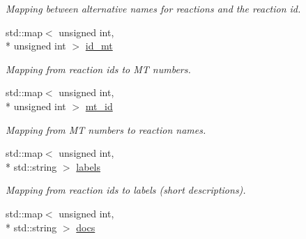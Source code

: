 \begin{DoxyCompactItemize}
\begin{DoxyCompactList}\small\item\em Mapping between alternative names for reactions and the reaction id. \end{DoxyCompactList}\item 
\hypertarget{namespacepyne_1_1rxname_a94ff01a63e221db69f259fa48616d3d5}{std\-::map$<$ unsigned int, \\*
unsigned int $>$ \hyperlink{namespacepyne_1_1rxname_a94ff01a63e221db69f259fa48616d3d5}{id\-\_\-mt}}\label{namespacepyne_1_1rxname_a94ff01a63e221db69f259fa48616d3d5}

\begin{DoxyCompactList}\small\item\em Mapping from reaction ids to M\-T numbers. \end{DoxyCompactList}\item 
\hypertarget{namespacepyne_1_1rxname_aca6dede953b1e7c1400ea23d40dce88c}{std\-::map$<$ unsigned int, \\*
unsigned int $>$ \hyperlink{namespacepyne_1_1rxname_aca6dede953b1e7c1400ea23d40dce88c}{mt\-\_\-id}}\label{namespacepyne_1_1rxname_aca6dede953b1e7c1400ea23d40dce88c}

\begin{DoxyCompactList}\small\item\em Mapping from M\-T numbers to reaction names. \end{DoxyCompactList}\item 
\hypertarget{namespacepyne_1_1rxname_a17fd6738dc8fcc8d08f3496926738364}{std\-::map$<$ unsigned int, \\*
std\-::string $>$ \hyperlink{namespacepyne_1_1rxname_a17fd6738dc8fcc8d08f3496926738364}{labels}}\label{namespacepyne_1_1rxname_a17fd6738dc8fcc8d08f3496926738364}

\begin{DoxyCompactList}\small\item\em Mapping from reaction ids to labels (short descriptions). \end{DoxyCompactList}\item 
\hypertarget{namespacepyne_1_1rxname_a1fcbb2b6dcf86e49cc70c4dfabf409ef}{std\-::map$<$ unsigned int, \\*
std\-::string $>$ \hyperlink{namespacepyne_1_1rxname_a1fcbb2b6dcf86e49cc70c4dfabf409ef}{docs}}\label{namespacepyne_1_1rxname_a1fcbb2b6dcf86e49cc70c4dfabf409ef}


\end{DoxyCompactItemize}
